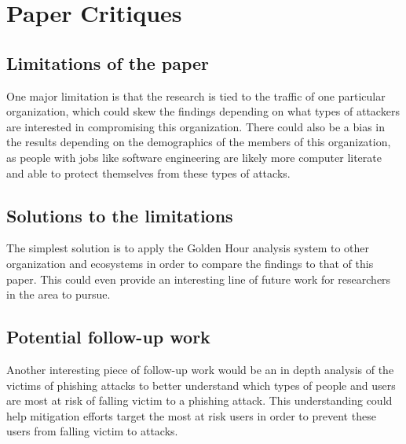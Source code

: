 \documentclass[11pt]{article}
\begin{document}
\section*{Paper Critiques}

\subsection*{Limitations of the paper}

One major limitation is that the research is tied to the traffic of one particular organization, which could skew the findings depending on what types of attackers are interested in compromising this organization.
There could also be a bias in the results depending on the demographics of the members of this organization, as people with jobs like software engineering are likely more computer literate and able to protect themselves from these types of attacks.

\subsection*{Solutions to the limitations}

The simplest solution is to apply the Golden Hour analysis system to other organization and ecosystems in order to compare the findings to that of this paper.
This could even provide an interesting line of future work for researchers in the area to pursue.

\subsection*{Potential follow-up work}

Another interesting piece of follow-up work would be an in depth analysis of the victims of phishing attacks to better understand which types of people and users are most at risk of falling victim to a phishing attack.
This understanding could help mitigation efforts target the most at risk users in order to prevent these users from falling victim to attacks.
\end{document}
